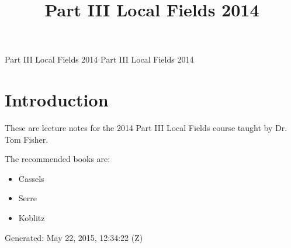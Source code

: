 \documentclass[10pt,]{book}
\title{Part III Local Fields 2014}
\author{}
\date{}
\theoremstyle{plain}
\theoremstyle{definition}
\begin{document}
\frontmatter
\thispagestyle{empty}
{\centering
\vspace*{0.28\textheight}
{\Huge Part III Local Fields 2014}}
\clearpage
\thispagestyle{empty}
\null%
\clearpage
\thispagestyle{empty}
{\centering
\vspace*{0.14\textheight}
{\Huge Part III Local Fields 2014}\\[2\baselineskip]
}
\clearpage
\thispagestyle{empty}
\null\clearpage
\setcounter{tocdepth}{1}
\renewcommand*\contentsname{Contents}
\tableofcontents
\mainmatter
\typeout{************************************************}
\typeout{************************************************}
\chapter[Introduction]{Introduction}\label{chap-introduction}
These are lecture notes for the 2014 Part III Local Fields course taught by Dr. Tom Fisher.%
\par
The recommended books are:
        \begin{itemize}[label=\textbullet]
\item{}Cassels\item{}Serre\item{}Koblitz\end{itemize}

\par
Generated: May 22, 2015, 12:34:22 (Z)%
\typeout{************************************************}
\typeout{************************************************}
\end{document}
